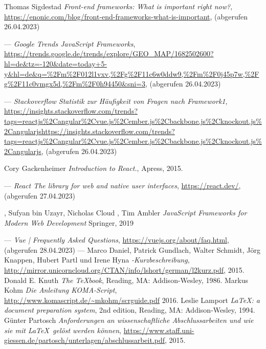 %

\begin{thebibliography}{99}

    Thomas Sigdestad
	\emph{Front-end frameworks: What is important right now?},
	\url{https://enonic.com/blog/front-end-frameworks-what-is-important},
    (abgerufen 26.04.2023)

	---
	\emph{Google Trends JavaScript Frameworks},
	\url{https://trends.google.de/trends/explore/GEO_MAP/1682502600?hl=de&tz=-120&date=today+5-y&hl=de&q=%2Fm%2F012l1vxv,%2Fg%2F11c6w0ddw9,%2Fm%2F0j45p7w,%2Fg%2F11c0vmgx5d,%2Fm%2F0h94450&sni=3},
	(abgerufen 26.04.2023)

	---
	\emph{Stackoverflow Statistik zur Häufigkeit von Fragen nach Framework1},
	\url{https://insights.stackoverflow.com/trends?tags=reactjs%2Cangular%2Cvue.js%2Cember.js%2Cbackbone.js%2Cknockout.js%2Cangularjshttps://insights.stackoverflow.com/trends?tags=reactjs%2Cangular%2Cvue.js%2Cember.js%2Cbackbone.js%2Cknockout.js%2Cangularjs},
	(abgerufen 26.04.2023)

	Cory Gackenheimer
	\emph{Introduction to React.},
	Apress,
	2015.

	---
	\emph{React
	The library for web and native user interfaces},
	\url{https://react.dev/},
	(abgerufen 27.04.2023)

,
	Sufyan bin Uzayr, Nicholas Cloud , Tim Ambler
	\emph{JavaScript Frameworks for Modern Web Development}
	Springer,
	2019

	---
	\emph{Vue | Frequently Asked Questions},
	\url{https://vuejs.org/about/faq.html},
	(abgerufen 28.04.2023)
---
	Marco Daniel, Patrick Gundlach, Walter Schmidt, Jörg Knappen, Hubert
	Partl und Irene Hyna
	\emph{\LaTeXe-Kurzbeschreibung},
	\url{http://mirror.unicorncloud.org/CTAN/info/lshort/german/l2kurz.pdf},
	2015.
	Donald E. Knuth
	\emph{The \TeX book},
  Reading, MA: Addison-Wesley,
	1986.
	Markus Kohm
	\emph{Die Anleitung \textsf{KOMA-Script}},
	\url{http://www.komascript.de/~mkohm/scrguide.pdf}
	2016.
  Leslie Lamport
  \emph{\LaTeX: a document preparation system},
  2nd edition,
  Reading, MA: Addison-Wesley,
  1994.
	Günter Partosch
	\emph{Anforderungen an wissenschaftliche Abschlussarbeiten und wie sie
	mit \LaTeX\ gelöst werden können},
	\url{https://www.staff.uni-giessen.de/partosch/unterlagen/abschlussarbeit.pdf},
	2015.

\end{thebibliography}

